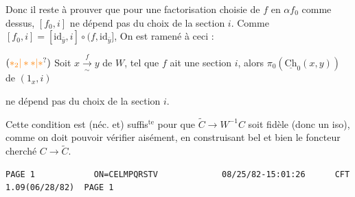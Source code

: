 
Donc il reste à prouver que  pour une factorisation choisie de $f$ en $\alpha f_0$ comme dessus, $[f_0,i]$ ne dépend pas du choix de la section $i$. Comme $[f_0,i]=[\mathrm{id}_{\bar y},i]\circ(f,\mathrm{id}_{\bar y}]$, On est ramené à ceci :


$(\unsure{\ast_2|\ast\ast|\ast})$ Soit $x\xrightarrow[\sim]{f}y$ de $W$, tel que $f$ ait une  section $i$, alors   $\pi_0(\underline{\mathrm{Ch}}_0(x,y))$  de $(1_x,i)$


ne dépend pas du choix de la section $i$.

Cette condition est (néc. et) suffis$^{\mathrm{te}}$ pour que $\widetilde C\longrightarrow W^{-1}C$ soit fidèle (donc un iso), comme on doit pouvoir vérifier aisément, en construisant bel et bien le foncteur cherché $C\longrightarrow\widetilde C$.



{\fontsize{5}{6}\selectfont
\begin{verbatim}
PAGE 1            ON=CELMPQRSTV             08/25/82-15:01:26      CFT 1.09(06/28/82)  PAGE 1
\end{verbatim}
}

